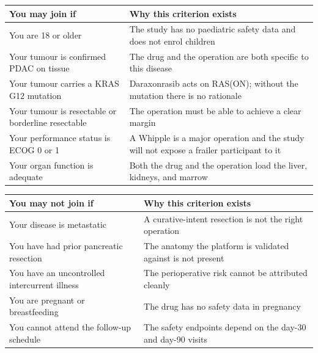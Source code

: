 
\vspace{0.30em}

\noindent\begin{tabularx}{\textwidth}{L{5.4cm} Y}
\toprule
\textbf{You may join if} & \textbf{Why this criterion exists} \\
\midrule
You are 18 or older & The study has no paediatric safety data and does not enrol children \\
Your tumour is confirmed PDAC on tissue & The drug and the operation are both specific to this disease \\
Your tumour carries a KRAS G12 mutation & Daraxonrasib acts on RAS(ON); without the mutation there is no rationale \\
Your tumour is resectable or borderline resectable & The operation must be able to achieve a clear margin \\
Your performance status is ECOG 0 or 1 & A Whipple is a major operation and the study will not expose a frailer participant to it \\
Your organ function is adequate & Both the drug and the operation load the liver, kidneys, and marrow \\
\bottomrule
\end{tabularx}

\vspace{0.30em}

\noindent\begin{tabularx}{\textwidth}{L{5.4cm} Y}
\toprule
\textbf{You may not join if} & \textbf{Why this criterion exists} \\
\midrule
Your disease is metastatic & A curative-intent resection is not the right operation \\
You have had prior pancreatic resection & The anatomy the platform is validated against is not present \\
You have an uncontrolled intercurrent illness & The perioperative risk cannot be attributed cleanly \\
You are pregnant or breastfeeding & The drug has no safety data in pregnancy \\
You cannot attend the follow-up schedule & The safety endpoints depend on the day-30 and day-90 visits \\
\bottomrule
\end{tabularx}

